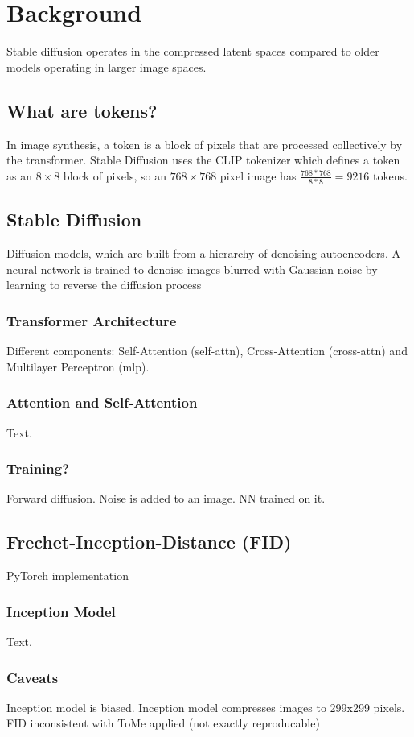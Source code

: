 \section{Background}
Stable diffusion operates in the compressed latent spaces compared to older models operating in larger image spaces.

\subsection{What are tokens?}
In image synthesis, a token is a block of pixels that are processed collectively by the transformer. Stable Diffusion uses the CLIP tokenizer\cite{radford2021learning} which defines a token as an $8 \times 8$ block of pixels, so an $768 \times 768$ pixel image has \(\frac{768*768}{8*8}=9216\) tokens.

\subsection{Stable Diffusion}
Diffusion models, which are built from a hierarchy of
denoising autoencoders. A neural network is trained to denoise images blurred with Gaussian noise by learning to reverse the diffusion process

\subsubsection{Transformer Architecture}
Different components: Self-Attention (self-attn), Cross-Attention (cross-attn) and Multilayer Perceptron (mlp).

\subsubsection{Attention and Self-Attention}
Text.

\subsubsection{Training?}
Forward diffusion. Noise is added to an image. NN trained on it.

\subsection{Frechet-Inception-Distance (FID)}
PyTorch implementation\cite{Seitzer2020FID}

\subsubsection{Inception Model}
Text.

\subsubsection{Caveats}
Inception model is biased. Inception model compresses images to 299x299 pixels. FID inconsistent with ToMe applied (not exactly reproducable)